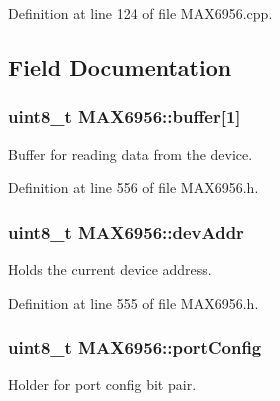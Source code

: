 Definition at line 124 of file M\-A\-X6956.\-cpp.



\subsection{Field Documentation}
\hypertarget{classMAX6956_a9f4597436b10ee86a02c96c2b0605851}{
\subsubsection[{buffer}]{\setlength{\rightskip}{0pt plus 5cm}uint8\-\_\-t M\-A\-X6956\-::buffer\mbox{[}1\mbox{]}\hspace{0.3cm}{\ttfamily [private]}}}\label{classMAX6956_a9f4597436b10ee86a02c96c2b0605851}


Buffer for reading data from the device. 



Definition at line 556 of file M\-A\-X6956.\-h.

\hypertarget{classMAX6956_a6ba2f8011914df50d6022ab54b27748d}{
\subsubsection[{dev\-Addr}]{\setlength{\rightskip}{0pt plus 5cm}uint8\-\_\-t M\-A\-X6956\-::dev\-Addr\hspace{0.3cm}{\ttfamily [private]}}}\label{classMAX6956_a6ba2f8011914df50d6022ab54b27748d}


Holds the current device address. 



Definition at line 555 of file M\-A\-X6956.\-h.

\hypertarget{classMAX6956_a9799e7684546e3e9b24506d436586a09}{
\subsubsection[{port\-Config}]{\setlength{\rightskip}{0pt plus 5cm}uint8\-\_\-t M\-A\-X6956\-::port\-Config\hspace{0.3cm}{\ttfamily [private]}}}\label{classMAX6956_a9799e7684546e3e9b24506d436586a09}


Holder for port config bit pair. 



